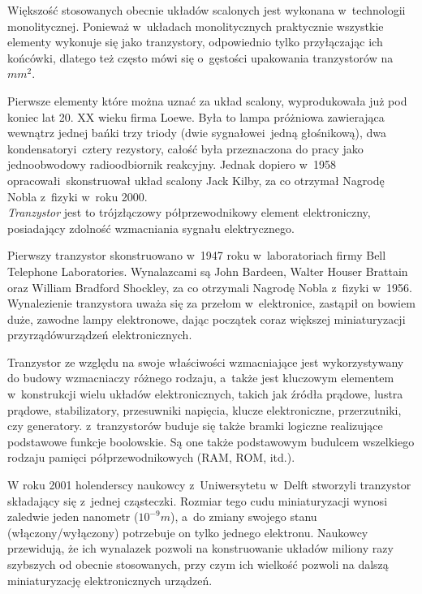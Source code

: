 \documentclass[a4paper,11pt]{article}
\begin{document}
Większość stosowanych obecnie układów scalonych jest wykonana w~technologii monolitycznej. Ponieważ w~układach monolitycznych praktycznie wszystkie elementy wykonuje się jako tranzystory, odpowiednio tylko przyłączając ich końcówki, dlatego też często mówi się o~gęstości upakowania tranzystorów na \emph{$mm^{2}$}.

Pierwsze elementy które można uznać za układ scalony, wyprodukowała już pod koniec lat 20. XX wieku firma Loewe. Była to lampa próżniowa zawierająca wewnątrz jednej bańki trzy triody (dwie sygnałowei~jedną głośnikową), dwa kondensatoryi~cztery rezystory, całość była przeznaczona do pracy jako jednoobwodowy radioodbiornik reakcyjny. Jednak dopiero w~1958 opracowałi~skonstruował układ scalony Jack Kilby, za co otrzymał Nagrodę Nobla z~fizyki w~roku 2000. \\

\emph{Tranzystor} jest to trójzłączowy półprzewodnikowy element elektroniczny, posiadający zdolność wzmacniania sygnału elektrycznego.

Pierwszy tranzystor skonstruowano w~1947 roku w~laboratoriach firmy Bell Telephone Laboratories. Wynalazcami są John Bardeen, Walter Houser Brattain oraz William Bradford Shockley, za co otrzymali Nagrodę Nobla z~fizyki w~1956. Wynalezienie tranzystora uważa się za przełom w~elektronice, zastąpił on bowiem duże, zawodne lampy elektronowe, dając początek coraz większej miniaturyzacji przyrządówurządzeń elektronicznych. 

Tranzystor ze względu na swoje właściwości wzmacniające jest  wykorzystywany do budowy wzmacniaczy różnego rodzaju, a~także jest kluczowym elementem w~konstrukcji wielu układów elektronicznych, takich jak źródła prądowe, lustra prądowe, stabilizatory, przesuwniki napięcia, klucze elektroniczne, przerzutniki, czy generatory. z~tranzystorów buduje się także bramki logiczne realizujące podstawowe funkcje boolowskie. Są one także podstawowym budulcem wszelkiego rodzaju pamięci półprzewodnikowych (RAM, ROM, itd.).

W roku 2001 holenderscy naukowcy z~Uniwersytetu w~Delft stworzyli tranzystor składający się z~jednej cząsteczki. Rozmiar tego cudu miniaturyzacji wynosi zaledwie jeden nanometr ($10^{-9}m$), a~do zmiany swojego stanu (włączony/wyłączony) potrzebuje on tylko jednego elektronu. Naukowcy przewidują, że ich wynalazek pozwoli na konstruowanie układów miliony razy szybszych od obecnie stosowanych, przy czym ich wielkość pozwoli na dalszą miniaturyzację elektronicznych urządzeń.
\end{document}
